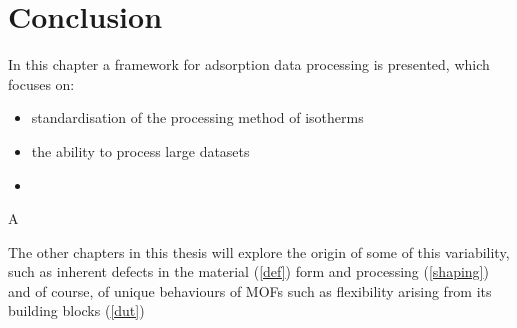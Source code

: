
\section{Conclusion}

In this chapter a framework for adsorption data processing is 
presented, which focuses on:

\begin{itemize}
    \item standardisation of the processing method of isotherms
    \item the ability to process large datasets 
    \item 
\end{itemize}

A

The other chapters in this thesis will explore the origin of some of
this variability, such as inherent defects in the material (\autoref{def})
form and processing (\autoref{shaping}) and of course, of unique behaviours
of MOFs such as flexibility arising from its building blocks (\autoref{dut})

\FloatBarrier%
\pagebreak